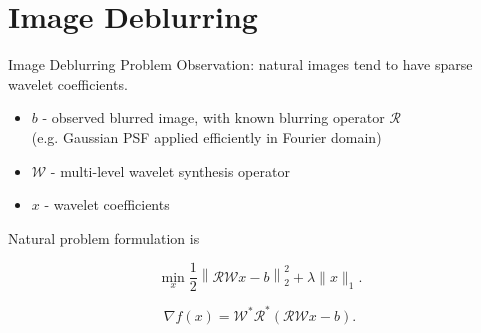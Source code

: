 \documentclass[xcolor=dvipsnames,t]{beamer} %
\begin{document}


\section{Image Deblurring}
\begin{frame}{Image Deblurring Problem}
   Observation: natural images tend to have sparse wavelet coefficients.\\
   
   \begin{itemize}
      \item $b$ - observed blurred image, with known blurring operator $\mathcal{R}$\\ (e.g. Gaussian PSF applied efficiently in Fourier domain)
      \item $\mathcal{W}$ - multi-level wavelet synthesis operator
      \item $x$ - wavelet coefficients
   \end{itemize}

   Natural problem formulation is

   \[ \min_x \dfrac{1}{2}\left\|\mathcal{RW}x-b\right\|_2^2 + \lambda \|x\|_1. \]

   \[ \nabla f(x) = \mathcal{W}^\ast\mathcal{R}^\ast\left(\mathcal{RW}x-b\right). \] 

\end{frame}
\end{document}
